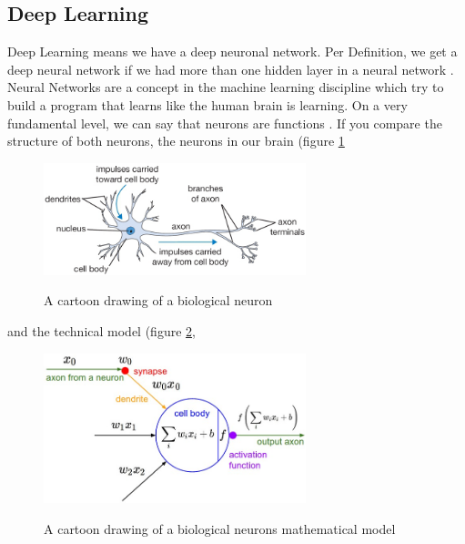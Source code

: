 \documentclass[journal]{IEEEtran}
\begin{document}
\subsection{Deep Learning}
\label{subsec:deeplearning}
Deep Learning means we have a deep neuronal network. Per Definition, we get a deep neural network if we had more than one hidden layer in a neural network \cite{Goodfellow-et-al-2016}. Neural Networks are a concept in the machine learning discipline which try to build a program that learns like the human brain is learning. On a very fundamental level, we can say that neurons are functions \cite{RN5}. If you compare the structure of both neurons, the neurons in our brain (figure \ref{fig:bioneuron}
\begin{figure}
  \begin{center}
  \includegraphics[width=3in]{photo/neuron-brain}\\
  \caption{A cartoon drawing of a biological neuron }
  \label{fig:bioneuron}
  \end{center}
\end{figure}
and the technical model (figure \ref{fig:mathneuron},
\begin{figure}
  \begin{center}
  \includegraphics[width=3in]{photo/neuron_model}\\
  \caption{A cartoon drawing of a biological neurons mathematical model}
  \label{fig:mathneuron}
  \end{center}
\end{figure}
\end{document}
